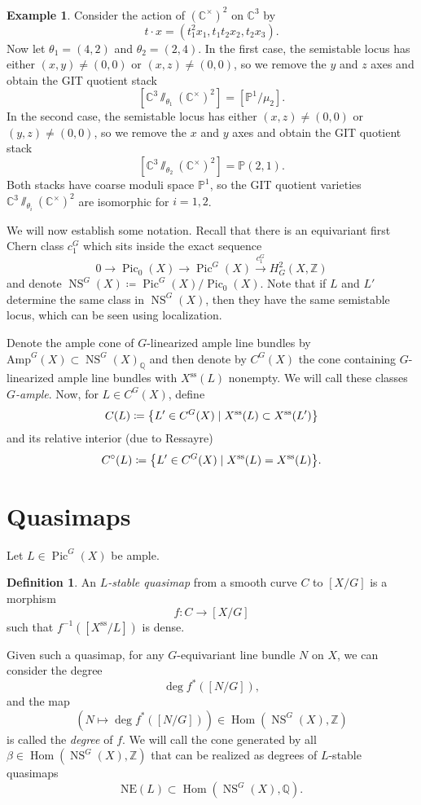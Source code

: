 \documentclass{amsart}
\theoremstyle{definition}
\newtheorem{defn}[thm]{Definition}
\newtheorem{exm}[thm]{Example}
\theoremstyle{remark}
\theoremstyle{plain}
\theoremstyle{definition}
\theoremstyle{remark}
\newcommand{\C}{\mathbb{C}}
\newcommand{\Z}{\mathbb{Z}}
\newcommand{\Q}{\mathbb{Q}}
\renewcommand{\P}{\mathbb{P}}
\newcommand{\mr}[1]{\mathrm{#1}}
\newcommand{\1}{\mathbf{1}}
\newcommand{\2}{\mathbf{2}}
\newcommand{\3}{\mathbf{3}}
\DeclareMathOperator{\Hom}{Hom}
\DeclareMathOperator{\Pic}{Pic}
\DeclareMathOperator{\NS}{NS}
\begin{document}
\begin{exm}
    Consider the action of $(\C^{\times})^2$ on $\C^3$ by
    \[ t \cdot x = (t_1^2 x_1, t_1 t_2 x_2, t_2 x_3). \]
    Now let $\theta_1 = (4,2)$ and $\theta_2 = (2,4)$. In the first case, the semistable locus has either $(x,y) \neq (0,0)$ or $(x,z) \neq (0,0)$, so we remove the $y$ and $z$ axes and obtain the GIT quotient stack
    \[ [\C^3 \sslash_{\theta_1} (\C^{\times})^2] = [\P^1 / \mu_2]. \]
    In the second case, the semistable locus has either $(x,z) \neq (0,0)$ or $(y, z) \neq (0,0)$, so we remove the $x$ and $y$ axes and obtain the GIT quotient stack
    \[ [\C^3 \sslash_{\theta_2} (\C^{\times})^2] = \P(2,1). \]
    Both stacks have coarse moduli space $\P^1$, so the GIT quotient varieties $\C^3 \sslash_{\theta_i} (\C^{\times})^2$ are isomorphic for $i = 1,2$.
\end{exm}


We will now establish some notation. Recall that there is an equivariant first Chern class $c_1^G$ which sits inside the exact sequence
\[ 0 \to \Pic_0(X) \to \Pic^G(X) \xrightarrow{c_1^G} H^2_G(X, \Z) \]
and denote $\NS^G(X) \coloneqq \Pic^G(X)/\Pic_0(X)$. Note that if $L$ and $L'$ determine the same class in $\NS^G(X)$, then they have the same semistable locus, which can be seen using localization.

Denote the ample cone of $G$-linearized ample line bundles by $\mr{Amp}^G(X) \subset \NS^G(X)_{\Q}$ and then denote by $C^G(X)$ the cone containing $G$-linearized ample line bundles with $X^{\mr{ss}}(L)$ nonempty. We will call these classes \textit{$G$-ample}. Now, for $L \in C^G(X)$, define
\[ C(L) \coloneqq \qty{L' \in C^G(X) \mid X^{\mr{ss}}(L) \subset X^{\mr{ss}}(L')} \]
and its relative interior (due to Ressayre)
\[ C^{\circ}(L) \coloneqq \qty{L' \in C^G(X) \mid X^{\mr{ss}}(L) = X^{\mr{ss}}(L)}. \]

\section{Quasimaps}

Let $L \in \Pic^G(X)$ be ample.
\begin{defn}
    An \textit{$L$-stable quasimap} from a smooth curve $C$ to $[X/G]$ is a morphism
    \[ f \colon C \to [X/G] \]
    such that $f^{-1}([X^{\mr{ss}}/L])$ is dense.
\end{defn}

Given such a quasimap, for any $G$-equivariant line bundle $N$ on $X$, we can consider the degree
\[ \deg f^*([N/G]), \]
and the map
\[ (N \mapsto \deg f^*([N/G])) \in \Hom(\NS^G(X), \Z) \]
is called the \textit{degree} of $f$. We will call the cone generated by all $\beta \in \Hom(\NS^G(X), \Z)$ that can be realized as degrees of $L$-stable quasimaps
\[ \mr{NE}(L) \subset \Hom(\NS^G(X), \Q). \]
\end{document}
